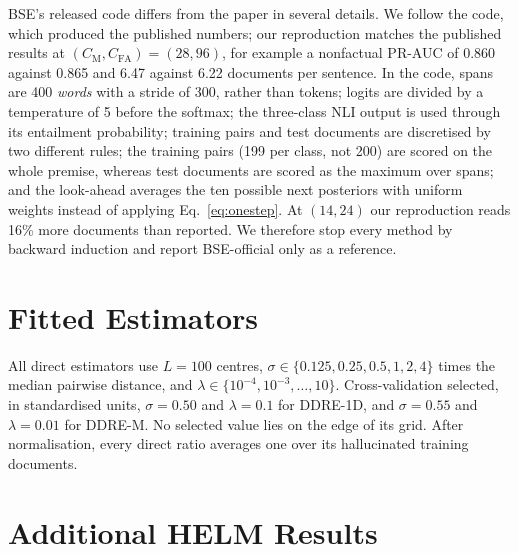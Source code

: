 \documentclass[11pt]{article}
\newcommand{\CM}{C_{\mathrm{M}}}
\newcommand{\CFA}{C_{\mathrm{FA}}}
\begin{document}
BSE's released code differs from the paper in several details. We follow the
code, which produced the published numbers; our reproduction matches the
published results at $(\CM, \CFA) = (28, 96)$, for example a nonfactual PR-AUC
of 0.860 against 0.865 and 6.47 against 6.22 documents per sentence. In the
code, spans are 400 \emph{words} with a stride of 300, rather than tokens;
logits are divided by a temperature of 5 before the softmax; the three-class
NLI output is used through its entailment probability; training pairs and test
documents are discretised by two different rules; the training pairs (199 per
class, not 200) are scored on the whole premise, whereas test documents are
scored as the maximum over spans; and the look-ahead averages the ten possible
next posteriors with uniform weights instead of applying
Eq.~\ref{eq:onestep}. At $(14, 24)$ our reproduction reads 16\% more documents
than reported. We therefore stop every method by backward induction and report
BSE-official only as a reference.

\section{Fitted Estimators}
\label{app:fit}

All direct estimators use $L = 100$ centres,
$\sigma \in \{0.125, 0.25, 0.5, 1, 2, 4\}$ times the median pairwise distance,
and $\lambda \in \{10^{-4}, 10^{-3}, \dots, 10\}$. Cross-validation selected,
in standardised units, $\sigma = 0.50$ and $\lambda = 0.1$ for DDRE-1D, and
$\sigma = 0.55$ and $\lambda = 0.01$ for DDRE-M. No selected value lies on the
edge of its grid. After normalisation, every direct ratio averages one over
its hallucinated training documents.

\section{Additional HELM Results}
\label{app:helm}
\end{document}
